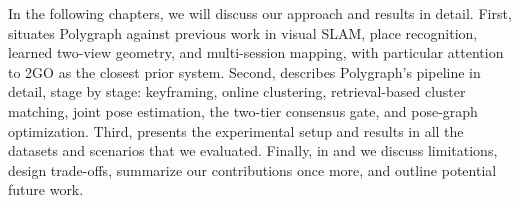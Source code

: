 In the following chapters, we will discuss our approach and results in detail. First,  situates Polygraph against previous work in visual SLAM, place recognition, learned two-view geometry, and multi-session mapping, with particular attention to 2GO as the closest prior system. Second,  describes Polygraph's pipeline in detail, stage by stage: keyframing, online clustering, retrieval-based cluster matching, joint pose estimation, the two-tier consensus gate, and pose-graph optimization. Third,  presents the experimental setup and results in all the datasets and scenarios that we evaluated. Finally, in  and  we discuss limitations, design trade-offs, summarize our contributions once more, and outline potential future work.